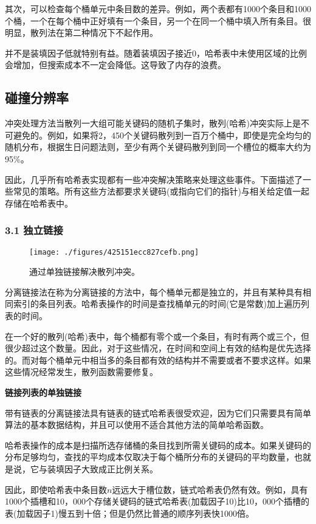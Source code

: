 其次，可以检查每个桶单元中条目数的差异。例如，两个表都有1000个条目和1000个桶，一个在每个桶中正好填有一个条目，另一个在同一个桶中填入所有条目。很明显，散列法在第二种情况下不起作用。

并不是装填因子低就特别有益。随着装填因子接近0，哈希表中未使用区域的比例会增加，但搜索成本不一定会降低。这导致了内存的浪费。

\subsection{碰撞分辨率}
冲突处理方法当散列一大组可能关键码的随机子集时，散列(哈希)冲突实际上是不可避免的。例如，如果将2，450个关键码散列到一百万个桶中，即使是完全均匀的随机分布，根据生日问题法则，至少有两个关键码散列到同一个槽位的概率大约为95\%。

因此，几乎所有哈希表实现都有一些冲突解决策略来处理这些事件。下面描述了一些常见的策略。所有这些方法都要求关键码(或指向它们的指针)与相关给定值一起存储在哈希表中。

\subsubsection{3.1 独立链接}
\begin{figure}[ht]
\centering
\texttt{[image: ./figures/425151ecc827cefb.png]}
\caption{通过单独链接解决散列冲突。} \label{fig_HXB_1}
\end{figure}
分离链接法在称为分离链接的方法中，每个桶单元都是独立的，并且有某种具有相同索引的条目列表。哈希表操作的时间是查找桶单元的时间(它是常数)加上遍历列表的时间。

在一个好的散列(哈希)表中，每个桶都有零个或一个条目，有时有两个或三个，但很少超过这个数量。因此，对于这些情况，在时间和空间上有效的结构是优先选择的。而对每个桶单元中相当多的条目都有效的结构并不需要或者不要求这样。如果这些情况经常发生，散列函数需要修复。

\textbf{链接列表的单独链接}

带有链表的分离链接法具有链表的链式哈希表很受欢迎，因为它们只需要具有简单算法的基本数据结构，并且可以使用不适合其他方法的简单哈希函数。

哈希表操作的成本是扫描所选存储桶的条目找到所需关键码的成本。如果关键码的分布足够均匀，查找的平均成本仅取决于每个桶所分布的关键码的平均数量，也就是说，它与装填因子大致成正比例关系。

因此，即使哈希表中条目数$n$远远大于槽位数，链式哈希表仍然有效。例如，具有1000个插槽和10，000个存储关键码的链式哈希表(加载因子10)比10，000个插槽的表(加载因子1)慢五到十倍；但是仍然比普通的顺序列表快1000倍。


